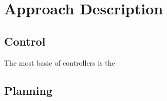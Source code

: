 \documentclass[oneside, 11pt]{book}
\begin{document}
\chapter{Approach Description}

\section{Control}\label{sec:control}
The most basic of controllers is the

\section{Planning}\label{sec:planning}

\chapter{}


%

\backmatter
\cleardoublepage
{}
{}
\printbibliography[heading=none]

\cleardoublepage
{}
{}
\printindex
\end{document}
